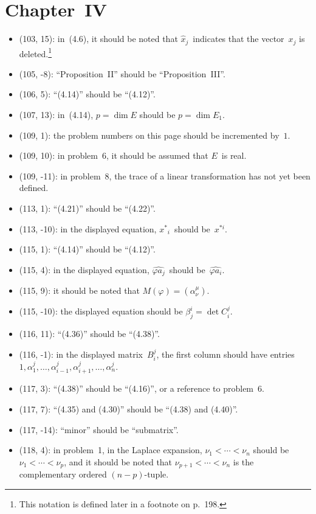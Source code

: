 \documentclass[letterpaper,12pt]{article}
\begin{document}
\section*{Chapter~IV}
\begin{itemize}
\item (103, 15): in~(4.6), it should be noted that \(\widehat{x}_j\)~indicates that the vector~\(x_j\) is deleted.\footnote{This notation is defined later in a footnote on p.~198.}
\item (105, -8): ``Proposition~II'' should be ``Proposition~III''.
\item (106, 5): ``(4.14)'' should be ``(4.12)''.
\item (107, 13): in~(4.14), \(p=\dim E\) should be \(p=\dim E_1\).
\item (109, 1): the problem numbers on this page should be incremented by~\(1\).
\item (109, 10): in problem~6, it should be assumed that \(E\)~is real.
\item (109, -11): in problem~8, the trace of a linear transformation has not yet been defined.
\item (113, 1): ``(4.21)'' should be ``(4.22)''.
\item (113, -10): in the displayed equation, \({x^*}_i\)~should be~\(x^{*i}\).
\item (115, 1): ``(4.14)'' should be ``(4.12)''.
\item (115, 4): in the displayed equation, \(\widehat{\varphi a_j}\)~should be~\(\widehat{\varphi a_i}\).
\item (115, 9): it should be noted that \(M(\varphi)=(\alpha^{\mu}_{\nu})\).
\item (115, -10): the displayed equation should be \(\beta^i_j=\det C^j_i\).
\item (116, 11): ``(4.36)'' should be ``(4.38)''.
\item (116, -1): in the displayed matrix~\(B^j_i\), the first column should have entries \(1,\alpha^j_1,\ldots,\alpha^j_{i-1},\alpha^j_{i+1},\ldots,\alpha^j_n\).
\item (117, 3): ``(4.38)'' should be ``(4.16)'', or a reference to problem~6.
\item (117, 7): ``(4.35) and (4.30)'' should be ``(4.38) and (4.40)''.
\item (117, -14): ``minor'' should be ``submatrix''.
\item (118, 4): in problem~1, in the Laplace expansion, \(\nu_1<\cdots<\nu_n\) should be \(\nu_1<\cdots<\nu_p\), and it should be noted that \(\nu_{p+1}<\cdots<\nu_n\) is the complementary ordered \((n-p)\)-tuple.

\end{itemize}
\end{document}
